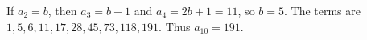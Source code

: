 If $a_2=b$, then $a_3=b+1$ and $a_4=2b+1=11$, so $b=5$. The terms are $1,5,6,11,17,28,45,73,118,191$. Thus $\boxed{a_{10}=191}$.
